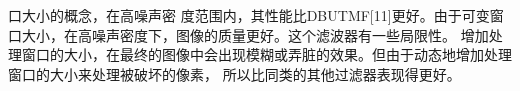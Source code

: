 \documentclass{article} %
\begin{document}
口大小的概念，在高噪声密
度范围内，其性能比DBUTMF[11]更好。由于可变窗口大小，在高噪声密度下，图像的质量更好。这个滤波器有一些局限性。
增加处理窗口的大小，在最终的图像中会出现模糊或弄脏的效果。但由于动态地增加处理窗口的大小来处理被破坏的像素，
所以比同类的其他过滤器表现得更好。
\end{document}

